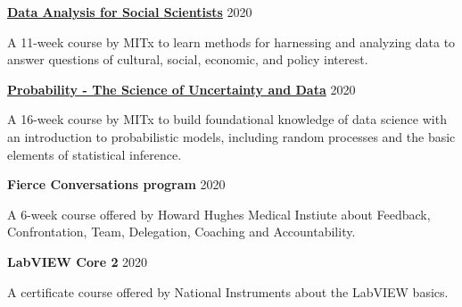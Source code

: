 \documentclass[margin,line]{res}
\begin{document}
\begin{resume}
\vspace*{-2mm}

{\bf \href{https://mitxonline.mit.edu/courses/course-v1:MITxT+14.310x/}{Data Analysis for Social Scientists}} \hfill {2020}\\
\vspace*{-3.5mm}
\begin{addmargin}[0pt]{.1\linewidth}
\vspace*{-1mm}
A 11-week course by MITx to learn methods for harnessing and analyzing data to answer questions of cultural, social, economic, and policy interest.
\end{addmargin}

\vspace*{-2mm}

{\bf \href{https://www.edx.org/course/probability-the-science-of-uncertainty-and-data}{Probability - The Science of Uncertainty and Data}} \hfill {2020}\\
\vspace*{-3.5mm}
\begin{addmargin}[0pt]{.1\linewidth}
\vspace*{-1mm}
A 16-week course by MITx to build foundational knowledge of data science with an introduction to probabilistic models, including random processes and the basic elements of statistical inference.
\end{addmargin}

\vspace*{-2mm}

{\bf Fierce Conversations program} \hfill {2020}\\
\vspace*{-3.5mm}
\begin{addmargin}[0pt]{.1\linewidth}
\vspace*{-1mm}
A 6-week course offered by Howard Hughes Medical Instiute about Feedback, Confrontation, Team, Delegation, Coaching and Accountability.
\end{addmargin}

\vspace*{-2mm}

{\bf LabVIEW Core 2} \hfill {2020}\\
\vspace*{-3.5mm}
\begin{addmargin}[0pt]{.1\linewidth}
\vspace*{-1mm}
A certificate course offered by National Instruments about the LabVIEW basics.
\end{addmargin}


\end{resume}
\end{document}
